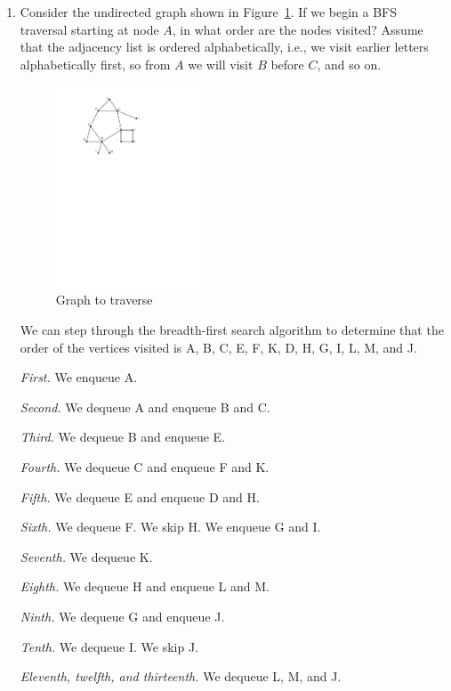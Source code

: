 \begin{enumerate}
    \item Consider the undirected graph shown in Figure~\ref{fig:box}.
    If we begin a BFS traversal starting at node $A$, in what order are the nodes visited? Assume that the adjacency list is ordered alphabetically, i.e., we visit earlier letters alphabetically first, so from $A$ we will visit $B$ before $C$, and so on.
    
    \begin{figure}[h]
        \centering
        \includegraphics[width=0.4\textwidth]{images/BFS.pdf}
        \caption{Graph to traverse}
        \label{fig:box}
    \end{figure}
\begin{solution}
We can step through the breadth-first search algorithm to determine that the order of the vertices visited is A, B, C, E, F, K, D, H, G, I, L, M, and J.

\textit{First. }We enqueue A.

\textit{Second. }We dequeue A and enqueue B and C.

\textit{Third. }We dequeue B and enqueue E.

\textit{Fourth. }We dequeue C and enqueue F and K.

\textit{Fifth. }We dequeue E and enqueue D and H.

\textit{Sixth. }We dequeue F. We skip H. We enqueue G and I.

\textit{Seventh. }We dequeue K.

\textit{Eighth. }We dequeue H and enqueue L and M.

\textit{Ninth. }We dequeue G and enqueue J.

\textit{Tenth. }We dequeue I. We skip J.

\textit{Eleventh, twelfth, and thirteenth. }We dequeue L, M, and J.


\end{solution}
\end{enumerate}
